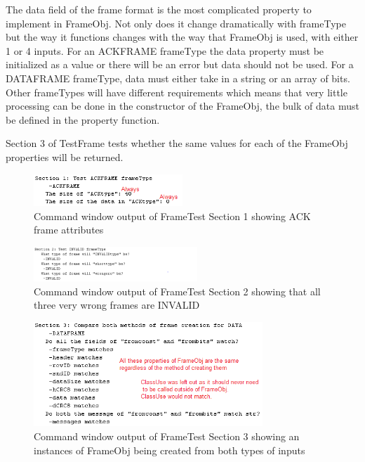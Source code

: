 The data field of the frame format is the most complicated property to implement in FrameObj. Not only does it change dramatically with frameType but the way it functions changes with the way that FrameObj is used, with either 1 or 4 inputs. For an ACKFRAME frameType the data property must be initialized as a value or there will be an error but data should not be used. For a DATAFRAME frameType, data must either take in a string or an array of bits. Other frameTypes will have different requirements which means that very little processing can be done in the constructor of the FrameObj, the bulk of data must be defined in the property function. 

Section 3 of TestFrame tests whether the same values for each of the FrameObj properties will be returned. 





\begin{figure}[p]
    \includegraphics[width=0.5\textwidth, left]{FrameTest1.PNG}
    \caption{Command window output of FrameTest Section 1 showing ACK frame attributes }
    \label{fig:FrameTest1}
\end{figure}

\begin{figure}[p]
    \includegraphics[width=0.55\textwidth, left]{FrameTest2.PNG}
    \caption{Command window output of FrameTest Section 2 showing that all three very wrong frames are INVALID }
    \label{fig:FrameTest2}
\end{figure}

\begin{figure}[p]
    \includegraphics[width=0.77\textwidth, left]{FrameTest3.PNG}
    \caption{Command window output of FrameTest Section 3 showing an instances of FrameObj being created from both types of inputs }
    \label{fig:FrameTest3}
\end{figure}

